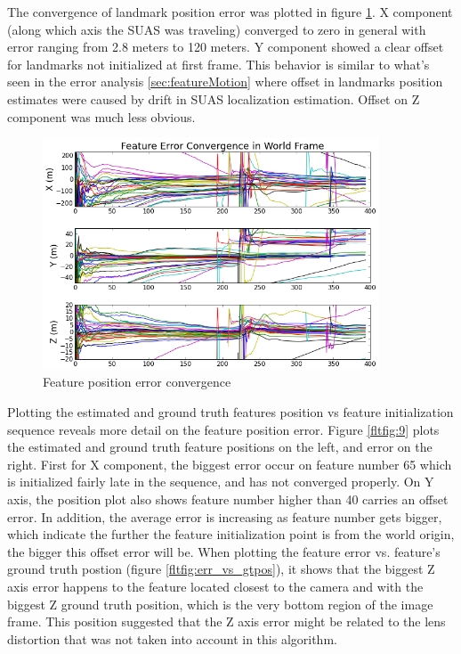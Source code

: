 The convergence of landmark position error was plotted in figure
\ref{fltfig:8}. X component (along which axis the SUAS was traveling)
converged to zero in general with error ranging from 2.8 meters to 120
meters. Y component showed a clear offset for landmarks not initialized
at first frame. This behavior is similar to what's seen in the
error analysis \ref{sec:featureMotion} where offset in landmarks
position estimates were caused by drift in SUAS localization
estimation. Offset on Z component was much less obvious.

\begin{figure}[h]
\centering
\includegraphics[width=10cm, keepaspectratio=true]
{./Figures/fltfig/cut1/Figure50.png}
\caption{Feature position error convergence}
\label{fltfig:8}
\end{figure}

Plotting the estimated and ground truth features position vs feature
initialization sequence reveals more detail on the feature position
error. Figure \ref{fltfig:9} plots the estimated and ground truth
feature positions on the left, and error on the right. First for X
component, the biggest error occur on feature number 65 which is
initialized fairly late in the sequence, and has not converged
properly. On Y axis, the position plot also shows feature number
higher than 40 carries an offset error. In addition, the average error
is increasing as feature number gets bigger, which indicate the
further the feature initialization point is from the world origin, the
bigger this offset error will be. When plotting the feature error vs.
feature's ground truth postion (figure \ref{fltfig:err_vs_gtpos}), it
shows that the biggest Z axis error happens to the feature located
closest to the camera and with the biggest Z ground truth position,
which is the very bottom region of the image frame. This position
suggested that the Z axis error might be related to the lens
distortion that was not taken into account in this algorithm.

